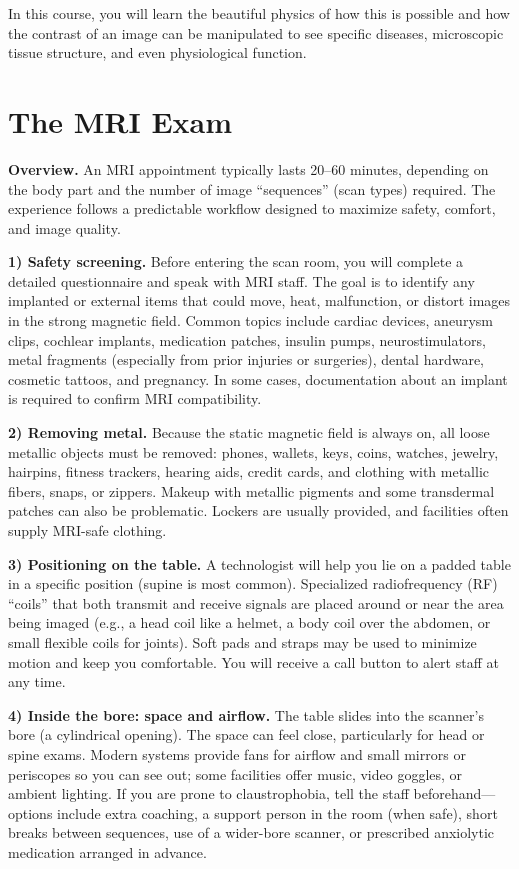 \documentclass[12pt]{article}
\begin{document}
{In this course, you will learn the beautiful physics of how this is possible and how the contrast of an image can be manipulated to see specific diseases, microscopic tissue structure, and even physiological function. 

\section{The MRI Exam}

\noindent\textbf{Overview.} An MRI appointment typically lasts 20--60 minutes, depending on the body part and the number of image ``sequences'' (scan types) required. The experience follows a predictable workflow designed to maximize safety, comfort, and image quality.

\medskip
\noindent\textbf{1) Safety screening.} Before entering the scan room, you will complete a detailed questionnaire and speak with MRI staff. The goal is to identify any implanted or external items that could move, heat, malfunction, or distort images in the strong magnetic field. Common topics include cardiac devices, aneurysm clips, cochlear implants, medication patches, insulin pumps, neurostimulators, metal fragments (especially from prior injuries or surgeries), dental hardware, cosmetic tattoos, and pregnancy. In some cases, documentation about an implant is required to confirm MRI compatibility.

\medskip
\noindent\textbf{2) Removing metal.} Because the static magnetic field is always on, all loose metallic objects must be removed: phones, wallets, keys, coins, watches, jewelry, hairpins, fitness trackers, hearing aids, credit cards, and clothing with metallic fibers, snaps, or zippers. Makeup with metallic pigments and some transdermal patches can also be problematic. Lockers are usually provided, and facilities often supply MRI-safe clothing.

\medskip
\noindent\textbf{3) Positioning on the table.} A technologist will help you lie on a padded table in a specific position (supine is most common). Specialized radiofrequency (RF) ``coils'' that both transmit and receive signals are placed around or near the area being imaged (e.g., a head coil like a helmet, a body coil over the abdomen, or small flexible coils for joints). Soft pads and straps may be used to minimize motion and keep you comfortable. You will receive a call button to alert staff at any time.

\medskip
\noindent\textbf{4) Inside the bore: space and airflow.} The table slides into the scanner's bore (a cylindrical opening). The space can feel close, particularly for head or spine exams. Modern systems provide fans for airflow and small mirrors or periscopes so you can see out; some facilities offer music, video goggles, or ambient lighting. If you are prone to claustrophobia, tell the staff beforehand—options include extra coaching, a support person in the room (when safe), short breaks between sequences, use of a wider-bore scanner, or prescribed anxiolytic medication arranged in advance.

}
\end{document}
